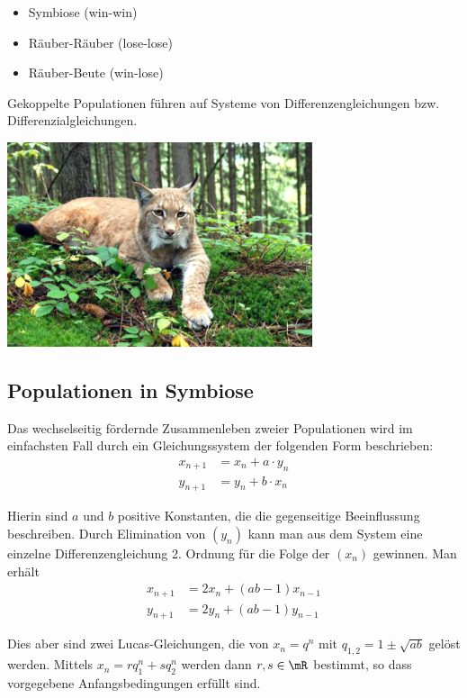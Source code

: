 \documentclass[%
11pt,%
twoside,%
titlepage,%
german,%
headsepline%
]{scrartcl}
\begin{document}
\begin{itemize}
\item Symbiose (win-win)
\item Räuber-Räuber (lose-lose)
\item Räuber-Beute (win-lose)
\end{itemize}

Gekoppelte Populationen führen auf Systeme von Differenzengleichungen bzw. Differenzialgleichungen.

\begin{center}
\includegraphics[height=6cm]{pictures/luchs.jpg}
\end{center}

\subsection{Populationen in Symbiose}
Das wechselseitig fördernde Zusammenleben zweier Populationen wird im einfachsten Fall durch ein Gleichungssystem der folgenden Form beschrieben:
\begin{align*}
x_{n+1} &= x_n+a\cdot y_n\\
y_{n+1} &= y_n+b\cdot x_n
\end{align*}

Hierin sind $a$ und $b$ positive Konstanten, die die gegenseitige Beeinflussung beschreiben. Durch Elimination von $(y_n)$ kann man aus dem System eine einzelne Differenzengleichung 2. Ordnung für die Folge der $(x_n)$ gewinnen. Man erhält
\begin{align*}
x_{n+1} &= 2x_n+(ab-1)x_{n-1}\\
y_{n+1} &= 2y_n+(ab-1)y_{n-1}
\end{align*}

Dies aber sind zwei Lucas-Gleichungen, die von $x_n = q^n$ mit $q_{1,2} = 1\pm\sqrt{ab}$ gelöst werden. Mittels $x_n=rq_1^n+sq_2^n$ werden dann $r,s\in\mR$ bestimmt, so dass vorgegebene Anfangsbedingungen erfüllt sind.
\end{document}
